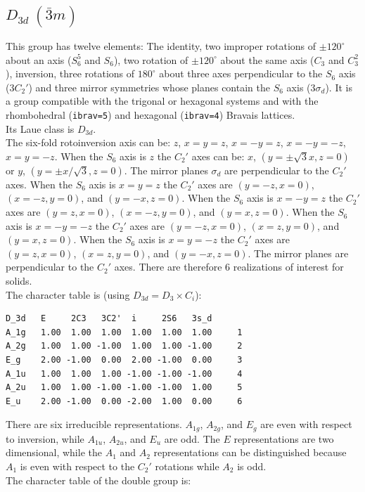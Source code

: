 \documentclass[12pt,a4paper]{article}
\begin{document}
\subsection{\color{web-blue}$D_{3d}\ (\bar 3m)$} 
This group has twelve elements: The identity, two improper rotations 
of $\pm120^\circ$ about an axis ($S_6^5$ and $S_6$), two rotation of 
$\pm120^\circ$ about the same axis ($C_3$ and $C_3^2$), inversion,
three rotations of $180^\circ$ about three axes perpendicular to the 
$S_6$ axis ($3C_2'$) and three mirror symmetries whose planes contain 
the $S_6$ axis ($3\sigma_d$).
It is a group compatible with the trigonal or hexagonal systems and with the  
rhombohedral (\texttt{ibrav=5}) and hexagonal (\texttt{ibrav=4}) Bravais lattices. \\
Its Laue class is $D_{3d}$. \\
The six-fold rotoinversion axis can be: $z$, $x=y=z$, $x=-y=z$,
$x=-y=-z$, $x=y=-z$.
When the $S_6$ axis is $z$ the $C_2'$ axes can be:
$x$, $(y=\pm\sqrt{3}x, z=0)$ or $y$, $(y=\pm x/\sqrt{3}, z=0)$. The mirror
planes $\sigma_d$ are perpendicular to the $C_2'$ axes.
When the $S_6$ axis is $x=y=z$ the $C_2'$ axes are $(y=-z, x=0)$, 
$(x=-z, y=0)$, and $(y=-x, z=0)$. When the $S_6$ axis is $x=-y=z$ 
the $C_2'$ axes are $(y=z, x=0)$, $(x=-z, y=0)$, and $(y=x, z=0)$. 
When the $S_6$ axis is $x=-y=-z$ the $C_2'$ axes are $(y=-z, x=0)$, 
$(x=z, y=0)$, and $(y=x, z=0)$.  When the $S_6$ axis is $x=y=-z$ the 
$C_2'$ axes are $(y=z, x=0)$, $(x=z, y=0)$, and $(y=-x, z=0)$. The mirror
planes are perpendicular to the $C_2'$ axes.
There are therefore $6$ realizations of interest for solids. \\
The character table is (using $D_{3d}=D_3 \times C_i$):
\begin{verbatim}
D_3d   E     2C3   3C2'  i     2S6   3s_d 
A_1g   1.00  1.00  1.00  1.00  1.00  1.00     1
A_2g   1.00  1.00 -1.00  1.00  1.00 -1.00     2
E_g    2.00 -1.00  0.00  2.00 -1.00  0.00     3
A_1u   1.00  1.00  1.00 -1.00 -1.00 -1.00     4
A_2u   1.00  1.00 -1.00 -1.00 -1.00  1.00     5
E_u    2.00 -1.00  0.00 -2.00  1.00  0.00     6
\end{verbatim}
There are six irreducible representations. $A_{1g}$, $A_{2g}$, and $E_g$
are even with respect to inversion, while $A_{1u}$, $A_{2u}$, and $E_u$ are
odd. The $E$ representations are two dimensional, while the $A_1$ and $A_2$
representations can be distinguished because $A_1$ is even with
respect to the $C_2'$ rotations while $A_2$ is odd. \\
The character table of the double group is:
\end{document}
